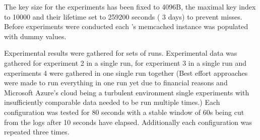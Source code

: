         The key size for the experiments has been fixed to 4096B, the maximal key index to 10000 and their lifetime
        set to 259200 seconds (\textrightarrow{} 3 days) to prevent misses. Before experiments were conducted
        each \srv{}'s memcached instance was populated with dummy values.

        Experimental results were gathered for sets of runs. Experimental data was gathered for experiment 2 in a
        single run, for experiment 3 in a single run and experiments 4 were gathered in one single run
        together (Best effort approaches were made to run everything in one run yet due to financial reasons and
        Microsoft Azure's cloud being a turbulent environment single experiments with insufficiently comparable data
        needed to be run multiple times.) Each configuration was tested for 80 seconds with a stable window of 60s being
        cut from the logs after 10 seconds have elapsed. Additionally each configuration was repeated three times.
